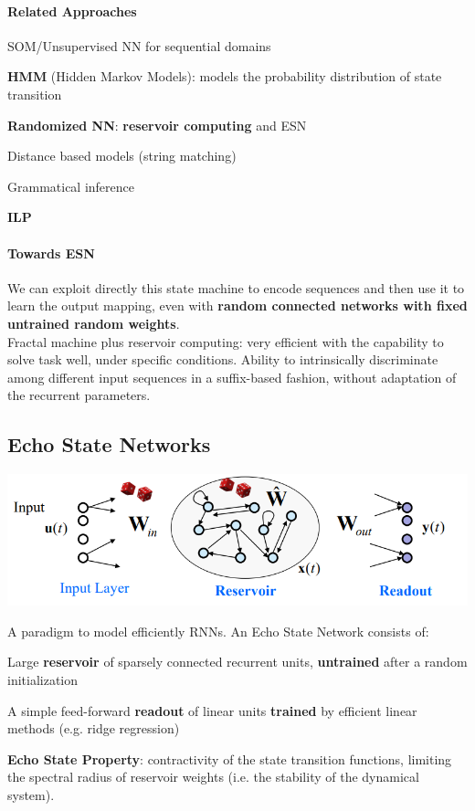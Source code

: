 \documentclass[10pt]{report}
\begin{document}
\paragraph{Related Approaches} \begin{list}{}{}
	\item SOM/Unsupervised NN for sequential domains
	\item \textbf{HMM} (Hidden Markov Models): models the probability distribution of state transition
	\item \textbf{Randomized NN}: \textbf{reservoir computing} and ESN
	\item Distance based models (string matching)
	\item Grammatical inference
	\item \textbf{ILP}
\end{list}
\paragraph{Towards ESN} We can exploit directly this state machine to encode sequences and then use it to learn the output mapping, even with \textbf{random connected networks with fixed untrained random weights}.\\
Fractal machine plus reservoir computing: very efficient with the capability to solve task well, under specific conditions. Ability to intrinsically discriminate among different input sequences in a suffix-based fashion, without adaptation of the recurrent parameters.
\subsection{Echo State Networks}
\begin{center}
	\includegraphics[scale=0.5]{39.png}
\end{center}
A paradigm to model efficiently RNNs. An Echo State Network consists of:
\begin{list}{}{}
	\item Large \textbf{reservoir} of sparsely connected recurrent units, \textbf{untrained} after a random initialization
	\item A simple feed-forward \textbf{readout} of linear units \textbf{trained} by efficient linear methods (e.g. ridge regression)
\end{list}
\textbf{Echo State Property}: contractivity of the state transition functions, limiting the spectral radius of reservoir weights (i.e. the stability of the dynamical system).
\end{document}
